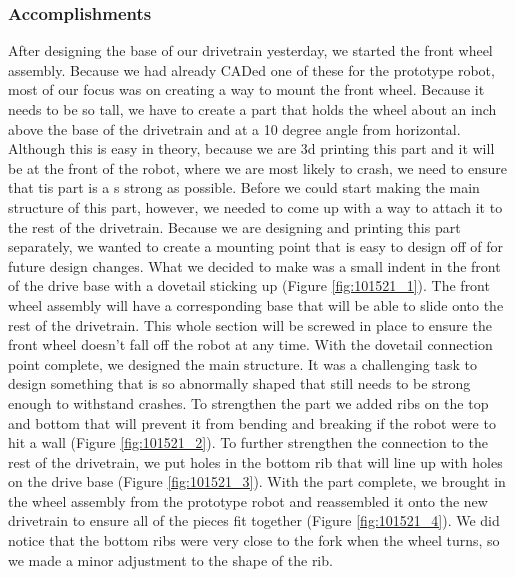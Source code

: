 \subsubsection*{Accomplishments}
After designing the base of our drivetrain yesterday, we started the front wheel assembly. Because we had already CADed one of these for the prototype robot, most of our focus was on creating a way to mount the front wheel. Because it needs to be so tall, we have to create a part that holds the wheel about an inch above the base of the drivetrain and at a 10 degree angle from horizontal. Although this is easy in theory, because we are 3d printing this part and it will be at the front of the robot, where we are most likely to crash, we need to ensure that tis part is a s strong as possible. Before we could start making the main structure of this part, however, we needed to come up with a way to attach it to the rest of the drivetrain. Because we are designing and printing this part separately, we wanted to create a mounting point that is easy to design off of for future design changes. What we decided to make was a small indent in the front of the drive base with a dovetail sticking up (Figure \ref{fig:101521_1}). The front wheel assembly will have a corresponding base that will be able to slide onto the rest of the drivetrain. This whole section will be screwed in place to ensure the front wheel doesn't fall off the robot at any time. 
With the dovetail connection point complete, we designed the main structure. It was a challenging task to design something that is so abnormally shaped that still needs to be strong enough to withstand crashes. To strengthen the part we added ribs on the top and bottom that will prevent it from bending and breaking if the robot were to hit a wall (Figure \ref{fig:101521_2}). To further strengthen the connection to the rest of the drivetrain, we put holes in the bottom rib that will line up with holes on the drive base (Figure \ref{fig:101521_3}). With the part complete, we brought in the wheel assembly from the prototype robot and reassembled it onto the new drivetrain to ensure all of the pieces fit together (Figure \ref{fig:101521_4}). We did notice that the bottom ribs were very close to the fork when the wheel turns, so we made a minor adjustment to the shape of the rib.

 


